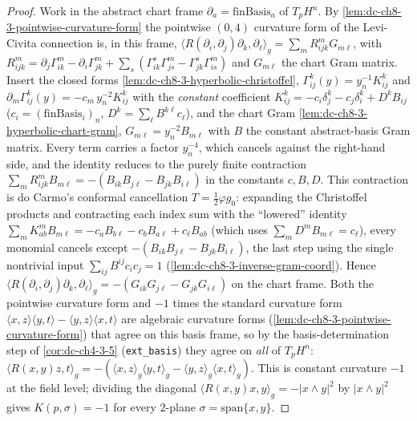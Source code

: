 \begin{proof}
  \leanok
  Work in the abstract chart frame $\partial_a=\text{finBasis}_a$ of $T_pH^n$. By
  \cref{lem:dc-ch8-3-pointwise-curvature-form} the pointwise $(0,4)$ curvature form
  of the Levi-Civita connection is, in this frame,
  $\langle R(\partial_i,\partial_j)\partial_k,\partial_\ell\rangle_g=\sum_m
  R^m_{ijk}G_{m\ell}$, with $R^m_{ijk}=\partial_j\Gamma^m_{ik}-\partial_i\Gamma^m_{jk}
  +\sum_s(\Gamma^s_{ik}\Gamma^m_{js}-\Gamma^s_{jk}\Gamma^m_{is})$ and $G_{m\ell}$
  the chart Gram matrix. Insert the closed forms
  \cref{lem:dc-ch8-3-hyperbolic-christoffel}, $\Gamma^k_{ij}(y)=y_n^{-1}K^k_{ij}$
  and $\partial_m\Gamma^k_{ij}(y)=-c_m\,y_n^{-2}K^k_{ij}$ with the \emph{constant}
  coefficient $K^k_{ij}=-c_i\delta^k_j-c_j\delta^k_i+D^kB_{ij}$
  ($c_i=(\text{finBasis}_i)_n$, $D^k=\sum_\ell B^{k\ell}c_\ell$), and the chart Gram
  \cref{lem:dc-ch8-3-hyperbolic-chart-gram}, $G_{m\ell}=y_n^{-2}B_{m\ell}$ with $B$
  the constant abstract-basis Gram matrix. Every term carries a factor $y_n^{-4}$,
  which cancels against the right-hand side, and the identity reduces to the purely
  finite contraction $\sum_m R^m_{ijk}B_{m\ell}=-(B_{ik}B_{j\ell}-B_{jk}B_{i\ell})$
  in the constants $c,B,D$. This contraction is do Carmo's conformal cancellation
  $T=\tfrac12\varphi g_0$: expanding the Christoffel products and contracting each
  index sum with the ``lowered'' identity $\sum_m K^m_{ab}B_{m\ell}=-c_aB_{b\ell}
  -c_bB_{a\ell}+c_\ell B_{ab}$ (which uses $\sum_m D^mB_{m\ell}=c_\ell$), every
  monomial cancels except $-(B_{ik}B_{j\ell}-B_{jk}B_{i\ell})$, the last step using
  the single nontrivial input $\sum_{ij}B^{ij}c_ic_j=1$
  (\cref{lem:dc-ch8-3-inverse-gram-coord}). Hence
  $\langle R(\partial_i,\partial_j)\partial_k,\partial_\ell\rangle_g
  =-(G_{ik}G_{j\ell}-G_{jk}G_{i\ell})$ on the chart frame. Both the pointwise
  curvature form and $-1$ times the standard curvature form
  $\langle x,z\rangle\langle y,t\rangle-\langle y,z\rangle\langle x,t\rangle$ are
  algebraic curvature forms (\cref{lem:dc-ch8-3-pointwise-curvature-form}) that
  agree on this basis frame, so by the basis-determination step of
  \cref{cor:dc-ch4-3-5} (\texttt{ext\_basis}) they agree on \emph{all} of $T_pH^n$:
  $\langle R(x,y)z,t\rangle_g=-(\langle x,z\rangle_g\langle y,t\rangle_g
  -\langle y,z\rangle_g\langle x,t\rangle_g)$. This is constant curvature $-1$ at the
  field level; dividing the diagonal $\langle R(x,y)x,y\rangle_g=-|x\wedge y|^2$ by
  $|x\wedge y|^2$ gives $K(p,\sigma)=-1$ for every $2$-plane
  $\sigma=\mathrm{span}\{x,y\}$.
\end{proof}


